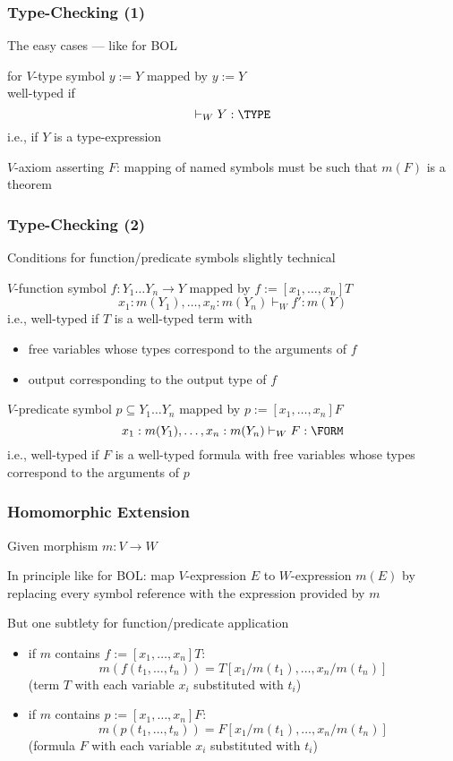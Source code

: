 \begin{frame}\frametitle{Type-Checking (1)}
\begin{blockitems}{The easy cases --- like for BOL}
\item for $V$-type symbol $y:=Y$ mapped by $y:=Y$ \\
well-typed if
 \[\vdash_W Y: \TYPE\]
i.e., if $Y$ is a type-expression
\item $V$-axiom asserting $F$: mapping of named symbols must be such that $m(F)$ is a theorem
\end{blockitems}
\end{frame}

\begin{frame}\frametitle{Type-Checking (2)}
\begin{blockitems}{Conditions for function/predicate symbols slightly technical}
\item $V$-function symbol $f:Y_1 \ldots Y_n\to Y$ mapped by $f:=[x_1,\ldots,x_n]T$\\
 \[x_1:m(Y_1),\ldots,x_n:m(Y_n)\vdash_W f': m(Y)\]
i.e., well-typed if $T$ is a well-typed term with
 \begin{itemize}
  \item free variables whose types correspond to the arguments of $f$
  \item output corresponding to the output type of $f$
 \end{itemize}
\item $V$-predicate symbol $p\subseteq Y_1\ldots Y_n$ mapped by $p:=[x_1,\ldots,x_n]F$
 \[x_1:m(Y_1),\ldots,x_n:m(Y_n)\vdash_W F: \FORM\]
i.e., well-typed if $F$ is a well-typed formula with free variables whose types correspond to the arguments of $p$
\end{blockitems}
\end{frame}


\begin{frame}\frametitle{Homomorphic Extension}
\begin{blockitems}{Given morphism $m:V\to W$}
\item In principle like for BOL: map $V$-expression $E$ to $W$-expression $m(E)$ by replacing every symbol reference with the expression provided by $m$
\item But one subtlety for function/predicate application
\begin{itemize}
 \item if $m$ contains $f:=[x_1,\ldots,x_n]T$:
   \[m(f(t_1,\ldots,t_n))=T[x_1/m(t_1),\ldots,x_n/m(t_n)]\]
  (term $T$ with each variable $x_i$ substituted with $t_i$)
 \item if $m$ contains $p:=[x_1,\ldots,x_n]F$:
   \[m(p(t_1,\ldots,t_n))=F[x_1/m(t_1),\ldots,x_n/m(t_n)]\]
  (formula $F$ with each variable $x_i$ substituted with $t_i$)
\end{itemize}
\end{blockitems}
\end{frame}

